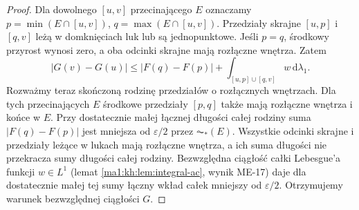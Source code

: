 \begin{proof}
Dla dowolnego $[u,v]$ przecinającego $E$ oznaczamy $p=\min(E\cap[u,v])$, $q=\max(E\cap[u,v])$. Przedziały skrajne $[u,p]$ i $[q,v]$ leżą w domknięciach luk lub są jednopunktowe. Jeśli $p=q$, środkowy przyrost wynosi zero, a oba odcinki skrajne mają rozłączne wnętrza. Zatem
\[
 |G(v)-G(u)|\le |F(q)-F(p)|
       +\int_{[u,p]\cup[q,v]} w\,\mathrm d\lambda_1.
\]
Rozważmy teraz skończoną rodzinę przedziałów o rozłącznych wnętrzach. Dla tych przecinających $E$ środkowe przedziały $[p,q]$ także mają rozłączne wnętrza i końce w $E$. Przy dostatecznie małej łącznej długości całej rodziny suma $|F(q)-F(p)|$ jest mniejsza od $\varepsilon/2$ przez $\AC_*(E)$. Wszystkie odcinki skrajne i przedziały leżące w lukach mają rozłączne wnętrza, a ich suma długości nie przekracza sumy długości całej rodziny. Bezwzględna ciągłość całki Lebesgue'a funkcji $w\in L^1$ (lemat \ref{ma1:kh:lem:integral-ac}, wynik ME-17) daje dla dostatecznie małej tej sumy łączny wkład całek mniejszy od $\varepsilon/2$. Otrzymujemy warunek bezwzględnej ciągłości $G$.
\end{proof}

